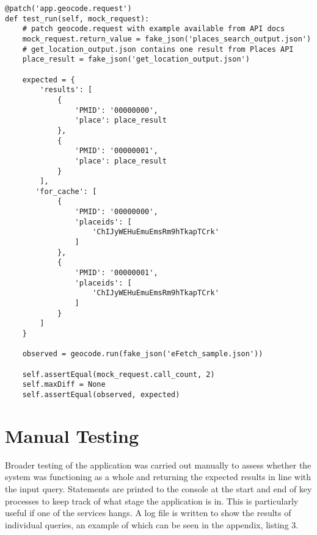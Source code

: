 \documentclass[Report.tex]{subfiles}
\begin{document}
\begin{lstlisting}
@patch('app.geocode.request')
def test_run(self, mock_request):
    # patch geocode.request with example available from API docs
    mock_request.return_value = fake_json('places_search_output.json')
    # get_location_output.json contains one result from Places API
    place_result = fake_json('get_location_output.json')

    expected = {
        'results': [
            {
                'PMID': '00000000',
                'place': place_result
            },
            {
                'PMID': '00000001',
                'place': place_result
            }
        ],
       'for_cache': [
            {
                'PMID': '00000000',
                'placeids': [
                    'ChIJyWEHuEmuEmsRm9hTkapTCrk'
                ]
            },
            {
                'PMID': '00000001',
                'placeids': [
                    'ChIJyWEHuEmuEmsRm9hTkapTCrk'
                ]
            }
        ]
    }

    observed = geocode.run(fake_json('eFetch_sample.json'))
    
    self.assertEqual(mock_request.call_count, 2)
    self.maxDiff = None
    self.assertEqual(observed, expected)
\end{lstlisting}

\section{Manual Testing}
Broader testing of the application was carried out manually to assess whether the system was functioning as a whole and returning the expected results in line with the input query. Statements are printed to the console at the start and end of key processes to keep track of what stage the application is in. This is particularly useful if one of the services hangs. A log file is written to show the results of individual queries, an example of which can be seen in the appendix, listing 3. 
\end{document}
